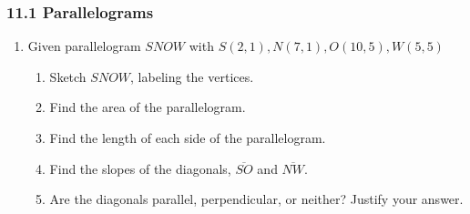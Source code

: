 

\fancyhead[LE]{\thepage}



\subsubsection*{11.1 Parallelograms }
\begin{enumerate}
\item Given parallelogram $SNOW$ with $S(2,1),N(7,1),O(10,5),W(5,5)$
\begin{enumerate}
  \item Sketch $SNOW$, labeling the vertices.\\
  \item Find the area of the parallelogram.\vspace{3cm}
  \item Find the length of each side of the parallelogram.\vspace{5cm}
  \item Find the slopes of the diagonals, $\overline{SO}$ and $\overline{NW}$.\vspace{3.5cm}
  \item Are the diagonals parallel, perpendicular, or neither? Justify your answer.
  \end{enumerate}

  
\end{enumerate}

  
